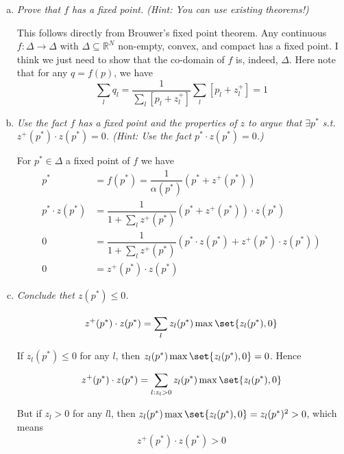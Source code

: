 \documentclass{article}
\begin{document}
\begin{enumerate}[1.]
\begin{enumerate}[a)]
      \item \textit{Prove that $f$ has a fixed point. (Hint: You can use existing theorems!)}

        \solution This follows directly from Brouwer's fixed point theorem. Any continuous $f: \Delta \to \Delta$ with $\Delta \subseteq \mathbb{R}^N$ non-empty, convex, and compact has a fixed point. I think we just need to show that the co-domain of $f$ is, indeed, $\Delta$. Here note that for any $q = f(p)$, we have
        \[
          \sum^{}_{l} q_l = \dfrac{1}{\sum^{}_{l} \left[p_l + z^+_l\right]} \sum^{}_{l} \left[p_l + z^+_l\right] = 1
        \]

      \item \textit{Use the fact $f$ has a fixed point and the properties of $z$ to argue that $\exists p^*$ s.t. $z^+(p^*) \cdot z(p^*) = 0$. (Hint: Use the fact $p^* \cdot z(p^*) = 0$.)}

        \solution For $p^* \in \Delta$ a fixed point of $f$ we have
        \begin{equation}
          \begin{array}{rl}
            p^*
            & = f(p^*) = \dfrac{1}{\alpha(p^*)} \left(p^* + z^+(p^*)\right)
            \\
            p^* \cdot z(p^*)
            & = \dfrac{1}{1 + \sum^{}_{l} z^+(p^*)} \left(p^* + z^+(p^*)\right) \cdot z(p^*)
            \\
            0
            & = \dfrac{1}{1 + \sum^{}_{l} z^+(p^*)} \left(p^* \cdot z(p^*) + z^+(p^*) \cdot z(p^*)\right)
            \\
            0
            & = z^+(p^*) \cdot z(p^*)
          \end{array}
          \nonumber
        \end{equation}

      \item \textit{Conclude thet $z(p^*) \le 0$.}

        \solution
        \[
          z^+(p^*) \cdot z(p^*)
          =
          \sum^{}_{l} z_l(p^*) \max\set{z_l(p^*), 0}
        \]

        If $z_l(p^*) \le 0$ for any $l$, then $z_l(p^*) \max\set{z_l(p^*), 0} = 0$. Hence
        \[
          z^+(p^*) \cdot z(p^*)
          =
          \sum^{}_{l: z_l > 0} z_l(p^*) \max\set{z_l(p^*), 0}
        \]

        But if $z_l > 0$ for any $l$l, then $z_l(p^*) \max\set{z_l(p^*), 0} = z_l(p^*)^2 > 0$, which means
        \[
          z^+(p^*) \cdot z(p^*) > 0
        \]


\end{enumerate}
\end{enumerate}
\end{document}
